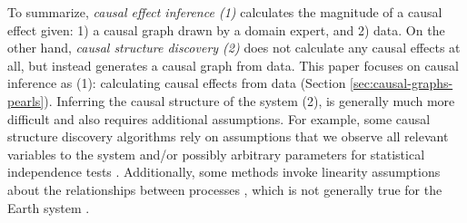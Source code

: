 \documentclass[12pt]{article}
\begin{document}
To summarize, \textit{causal effect inference (1)} calculates the
magnitude of a causal effect given: 1) a causal graph drawn by a
domain expert, and 2) data. On the other hand, \textit{causal
  structure discovery (2)} does not calculate any causal effects at
all, but instead generates a causal graph from data.  This paper
focuses on causal inference as (1): calculating causal effects from
data (Section \ref{sec:causal-graphs-pearls}). Inferring the causal
structure of the system (2), is generally much more difficult and also
requires additional assumptions. For example, some causal structure
discovery algorithms rely on assumptions that we observe all relevant
variables to the system and/or possibly arbitrary parameters for
statistical independence tests
\citep{runge2019inferring}. Additionally, some methods invoke
linearity assumptions about the relationships between processes
\citep{krich2019causal}, which is not generally true for the Earth
system \citep{palmer-nonlinaer-1999}.
\end{document}
